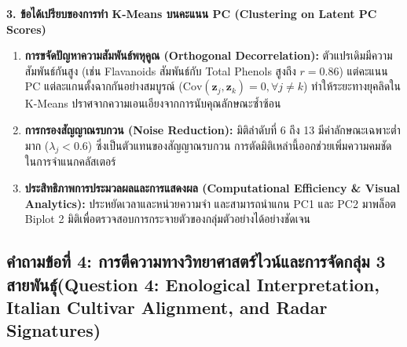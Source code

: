 \documentclass[12pt,a4paper]{article}
\begin{document}
\begin{ansbox}[unbreakable, fontupper={\fontsize{9.6pt}{12.6pt}\selectfont}, left=6pt, right=6pt, top=3pt, bottom=3pt]
\vspace{0.15em}
\noindent\textbf{\normalsize 3. ข้อได้เปรียบของการทำ K-Means บนคะแนน PC (Clustering on Latent PC Scores)}\par\vspace{0.05em}
\begin{enumerate}[leftmargin=1.2em, itemsep=0.5pt, topsep=0.5pt]
    \item \textbf{การขจัดปัญหาความสัมพันธ์พหุคูณ (Orthogonal Decorrelation):} ตัวแปรเดิมมีความสัมพันธ์กันสูง (เช่น Flavanoids สัมพันธ์กับ Total Phenols สูงถึง $r=0.86$) แต่คะแนน PC แต่ละแกนตั้งฉากกันอย่างสมบูรณ์ ($\text{Cov}(\mathbf{z}_j, \mathbf{z}_k) = 0, \forall j \neq k$) ทำให้ระยะทางยุคลิดใน K-Means ปราศจากความเอนเอียงจากการนับคุณลักษณะซ้ำซ้อน
    \item \textbf{การกรองสัญญาณรบกวน (Noise Reduction):} มิติลำดับที่ 6 ถึง 13 มีค่าลักษณะเฉพาะต่ำมาก ($\lambda_j < 0.6$) ซึ่งเป็นตัวแทนของสัญญาณรบกวน การตัดมิติเหล่านี้ออกช่วยเพิ่มความคมชัดในการจำแนกคลัสเตอร์
    \item \textbf{ประสิทธิภาพการประมวลผลและการแสดงผล (Computational Efficiency \& Visual Analytics):} ประหยัดเวลาและหน่วยความจำ และสามารถนำแกน PC1 และ PC2 มาพล็อต Biplot 2 มิติเพื่อตรวจสอบการกระจายตัวของกลุ่มตัวอย่างได้อย่างชัดเจน
\end{enumerate}
\end{ansbox}

\clearpage
\subsection*{คำถามข้อที่ 4: การตีความทางวิทยาศาสตร์ไวน์และการจัดกลุ่ม 3 สายพันธุ์\newline \normalsize(Question 4: Enological Interpretation, Italian Cultivar Alignment, and Radar Signatures)}
\vspace{-0.5em}
\end{document}

